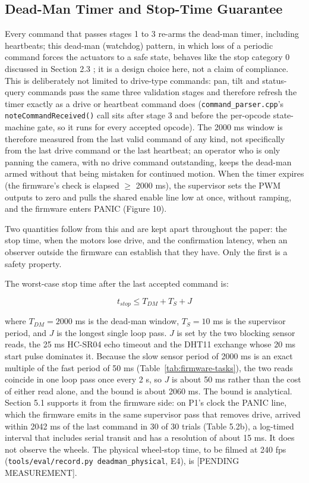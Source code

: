 \subsection{Dead-Man Timer and Stop-Time Guarantee}

Every command that passes stages 1 to 3 re-arms the dead-man timer, including heartbeats; this dead-man (watchdog) pattern, in which loss of a periodic command forces the actuators to a safe state, behaves like the stop category 0 discussed in Section 2.3 \cite{iec60204}; it is a design choice here, not a claim of compliance. This is deliberately not limited to drive-type commands: pan, tilt and status-query commands pass the same three validation stages and therefore refresh the timer exactly as a drive or heartbeat command does (\texttt{command\_parser.cpp}'s \texttt{noteCommandReceived()} call sits after stage 3 and before the per-opcode state-machine gate, so it runs for every accepted opcode). The 2000 ms window is therefore measured from the last valid command of any kind, not specifically from the last drive command or the last heartbeat; an operator who is only panning the camera, with no drive command outstanding, keeps the dead-man armed without that being mistaken for continued motion. When the timer expires (the firmware's check is elapsed $\geq$ 2000 ms), the supervisor sets the PWM outputs to zero and pulls the shared enable line low at once, without ramping, and the firmware enters PANIC (Figure 10).

Two quantities follow from this and are kept apart throughout the paper: the stop time, when the motors lose drive, and the confirmation latency, when an observer outside the firmware can establish that they have. Only the first is a safety property.

The worst-case stop time after the last accepted command is:

\begin{equation}
t_{stop} \le T_{DM} + T_{S} + J
\end{equation}

where $T_{DM} = 2000$ ms is the dead-man window, $T_{S} = 10$ ms is the supervisor period, and $J$ is the longest single loop pass. $J$ is set by the two blocking sensor reads, the 25 ms HC-SR04 echo timeout and the DHT11 exchange whose 20 ms start pulse dominates it. Because the slow sensor period of 2000 ms is an exact multiple of the fast period of 50 ms (Table~\ref{tab:firmware-tasks}), the two reads coincide in one loop pass once every 2 s, so $J$ is about 50 ms rather than the cost of either read alone, and the bound is about 2060 ms. The bound is analytical. Section 5.1 supports it from the firmware side: on P1's clock the PANIC line, which the firmware emits in the same supervisor pass that removes drive, arrived within 2042 ms of the last command in 30 of 30 trials (Table 5.2b), a log-timed interval that includes serial transit and has a resolution of about 15 ms. It does not observe the wheels. The physical wheel-stop time, to be filmed at 240 fps (\texttt{tools/eval/record.py deadman\_physical}, E4), is [PENDING MEASUREMENT].

